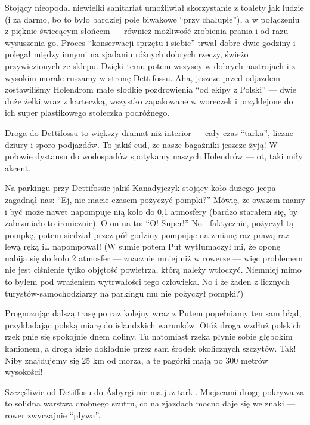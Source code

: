 Stojący nieopodal niewielki sanitariat umożliwiał skorzystanie z toalety jak ludzie (i za darmo, bo to było bardziej pole biwakowe “przy chałupie”), a w połączeniu z pięknie świecącym słońcem --- również możliwość zrobienia prania i od razu wysuszenia go. Proces “konserwacji sprzętu i siebie” trwał dobre dwie godziny i polegał między innymi na zjadaniu różnych dobrych rzeczy, świeżo przywiezionych ze sklepu. Dzięki temu potem wszyscy w dobrych nastrojach i z wysokim morale ruszamy w stronę Dettifossu. Aha, jeszcze przed odjazdem zostawiliśmy Holendrom małe słodkie pozdrowienia “od ekipy z Polski” --- dwie duże żelki wraz z karteczką, wszystko zapakowane w woreczek i przyklejone do ich super plastikowego stołeczka podróżnego.

Droga do Dettifossu to większy dramat niż interior --- cały czas “tarka”, liczne dziury i sporo podjazdów. To jakiś cud, że nasze bagażniki jeszcze żyją! W połowie dystansu do wodospadów spotykamy naszych Holendrów --- ot, taki miły akcent.


Na parkingu przy Dettifossie jakiś Kanadyjczyk stojący koło dużego jeepa zagadnął nas: “Ej, nie macie czasem pożyczyć pompki?” Mówię, że owszem mamy i być może nawet napompuje nią koło do 0,1 atmosfery (bardzo starałem się, by zabrzmiało to ironicznie). O on na to: “O! Super!” No i faktycznie, pożyczył tą pompkę, potem siedział przez pół godziny pompując na zmianę raz prawą raz lewą ręką i… napompował! (W sumie potem Put wytłumaczył mi, że oponę nabija się do koło 2 atmosfer --- znacznie mniej niż w rowerze --- więc problemem nie jest ciśnienie tylko objętość powietrza, którą należy wtłoczyć. Niemniej mimo to byłem pod wrażeniem wytrwałości tego człowieka. No i że żaden z licznych turystów-samochodziarzy na parkingu mu nie pożyczył pompki?)

Prognozując dalszą trasę po raz kolejny wraz z Putem popełniamy ten sam błąd, przykładając polską miarę do islandzkich warunków. Otóż droga wzdłuż polskich rzek pnie się spokojnie dnem doliny. Tu natomiast rzeka płynie sobie głębokim kanionem, a droga idzie dokładnie przez sam środek okolicznych szczytów. Tak! Niby znajdujemy się 25 km od morza, a te pagórki mają po 300 metrów wysokości!

Szczęśliwie od Detiffosu do Ásbyrgi nie ma już tarki. Miejscami drogę pokrywa za to solidna warstwa drobnego szutru, co na zjazdach mocno daje się we znaki --- rower zwyczajnie “pływa”.


